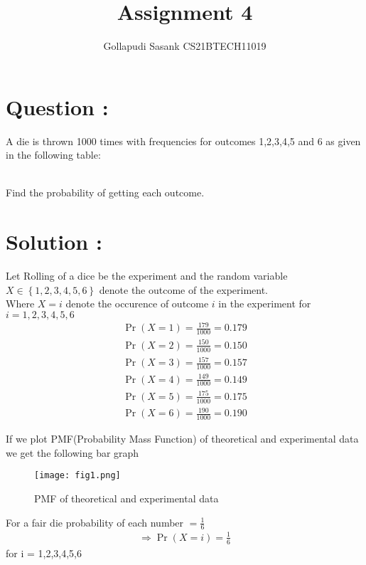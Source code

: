 \documentclass[twocolumn]{article}
\title{Assignment 4}
\author{Gollapudi Sasank CS21BTECH11019}
\providecommand{\pr}[1]{\ensuremath{\Pr\left(#1\right)}}
\providecommand{\cbrak}[1]{\ensuremath{\left\{#1\right\}}}
\begin{document}
\maketitle
\section*{Question : }
A die is thrown 1000 times with frequencies for outcomes 1,2,3,4,5 and 6 as given in the following table:
\begin{table}[ht]

\centering
\caption{}
\label{table:table 1}
\end{table}\\
Find the probability of getting each outcome.
\section*{Solution : }
Let Rolling of a dice be the experiment and the random variable $X \in \cbrak{1,2,3,4,5,6}$  denote the outcome of the experiment.\\
Where $X = i $ denote the occurence of outcome $i$ in the experiment for $ i = 1,2,3,4,5,6 $
\begin{align}
\pr{X = 1} = \frac{179}{1000} = 0.179 \\
\pr{X = 2} = \frac{150}{1000} = 0.150 \\
\pr{X = 3} = \frac{157}{1000} = 0.157 \\
\pr{X = 4} = \frac{149}{1000} = 0.149 \\
\pr{X = 5} = \frac{175}{1000} = 0.175 \\
\pr{X = 6} = \frac{190}{1000} = 0.190 
\end{align}

If we plot PMF(Probability Mass Function) of theoretical and experimental data we get the following bar graph 

\begin{figure}[h]
\texttt{[image: fig1.png]}
\caption{PMF of theoretical and experimental data}
\label{Fig 1}

\end{figure}
For a fair die probability of each number $ = \frac{1}{6} $ \\
\begin{align}
\Rightarrow
\pr{X = i}  = \frac{1}{6} 
\end{align}
 for i = 1,2,3,4,5,6
\end{document}
